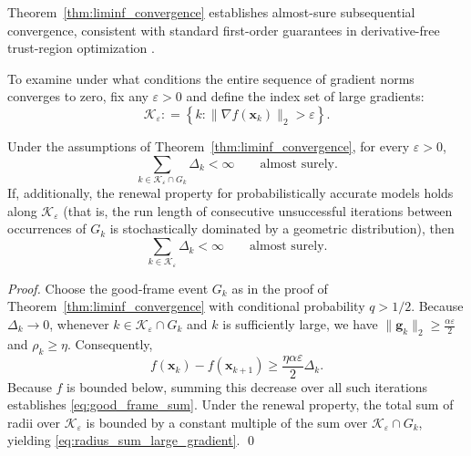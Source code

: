 \documentclass[smallextended]{svjour3}
\newcommand{\bx}{\bm{x}}
\newcommand{\bg}{\bm{g}}
\providecommand{\coloneqq}{\mathrel{\mathop:}=}
\begin{document}
Theorem~\ref{thm:liminf_convergence} establishes almost-sure subsequential convergence, consistent with standard first-order guarantees in derivative-free trust-region optimization \cite{conn2009introduction,conn2000trust}.

To examine under what conditions the entire sequence of gradient norms converges to zero, fix any $\varepsilon>0$ and define the index set of large gradients:
\begin{equation}
\mathcal K_\varepsilon \coloneqq \left\{ k : \|\nabla f(\bx_k)\|_2 > \varepsilon \right\}.
\end{equation}

\begin{lemma}
\label{lem:radius_sum_large_gradient}
Under the assumptions of Theorem~\ref{thm:liminf_convergence}, for every $\varepsilon>0$,
\begin{equation}
\label{eq:good_frame_sum}
\sum_{k\in\mathcal K_\varepsilon\cap G_k}\Delta_k < \infty \qquad \text{almost surely}.
\end{equation}
If, additionally, the renewal property for probabilistically accurate models holds along $\mathcal K_\varepsilon$ \cite{bandeira2014convergence,Gratton-2017} (that is, the run length of consecutive unsuccessful iterations between occurrences of $G_k$ is stochastically dominated by a geometric distribution), then
\begin{equation}
\label{eq:radius_sum_large_gradient}
\sum_{k\in\mathcal K_\varepsilon}\Delta_k < \infty \qquad \text{almost surely}.
\end{equation}
\end{lemma}

\begin{proof}
Choose the good-frame event $G_k$ as in the proof of Theorem~\ref{thm:liminf_convergence} with conditional probability $q > 1/2$. Because $\Delta_k\to0$, whenever $k\in\mathcal K_\varepsilon\cap G_k$ and $k$ is sufficiently large, we have $\|\bg_k\|_2 \ge \frac{\alpha\varepsilon}{2}$ and $\rho_k\ge\eta$. Consequently,
\[
f(\bx_k)-f(\bx_{k+1}) \ge \frac{\eta\alpha\varepsilon}{2}\Delta_k.
\]
Because $f$ is bounded below, summing this decrease over all such iterations establishes \eqref{eq:good_frame_sum}. Under the renewal property, the total sum of radii over $\mathcal K_\varepsilon$ is bounded by a constant multiple of the sum over $\mathcal K_\varepsilon \cap G_k$, yielding \eqref{eq:radius_sum_large_gradient}.
\qed
\end{proof}
\end{document}
